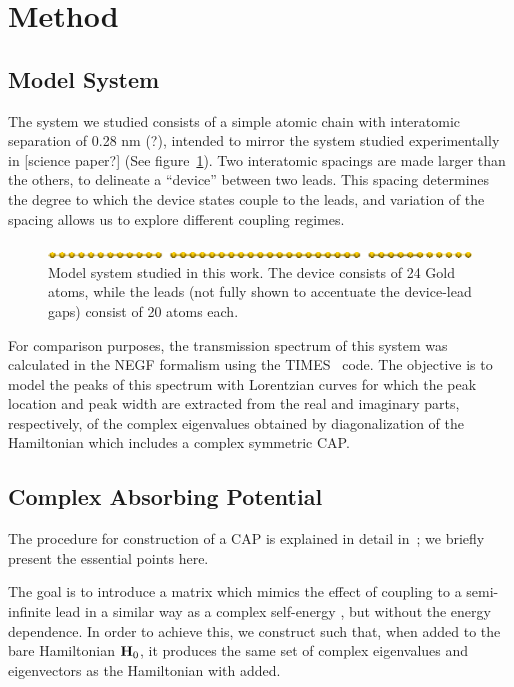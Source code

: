 \section{Method}
\label{sec:method}

\subsection{Model System}
\label{subsec:modelsystem}

The system we studied consists of a simple atomic chain with interatomic
separation of 0.28 nm (?), intended to mirror the system studied experimentally
in [science paper?] (See figure~\ref{fig:chaincapdevice}). Two interatomic
spacings are made larger than the others, to delineate a ``device'' between two
leads. This spacing determines the degree to which the device states couple to
the leads, and variation of the spacing allows us to explore different coupling
regimes.

\begin{figure}
	\begin{center}
		\includegraphics[width=0.9\linewidth]{figures/chaincapdevice}
	\end{center}
	\caption{Model system studied in this work. The device consists of 24
	Gold atoms, while the leads (not fully shown to accentuate the
	device-lead gaps) consist of 20 atoms each.}
	\label{fig:chaincapdevice}
\end{figure}

For comparison purposes, the transmission spectrum of this system was
calculated in the \ac{NEGF} formalism using the TIMES~\cite{times} code. The
objective is to model the peaks of this spectrum with Lorentzian curves for
which the peak location and peak width are extracted from the real and
imaginary parts, respectively, of the complex eigenvalues obtained by
diagonalization of the Hamiltonian which includes a complex symmetric \ac{CAP}.

\subsection{Complex Absorbing Potential}
\label{subsec:CAP}

The procedure for construction of a \ac{CAP} is explained in detail
in~\cite{henderson}; we briefly present the essential points here.

The goal is to introduce a matrix  which mimics the effect of coupling
to a semi-infinite lead in a similar way as a complex self-energy
, but without the energy dependence. In order to achieve this,
we construct  such that, when added to the bare Hamiltonian $\mathbf{H}_0$,
it produces the same set of complex eigenvalues and eigenvectors as the
Hamiltonian with  added.

